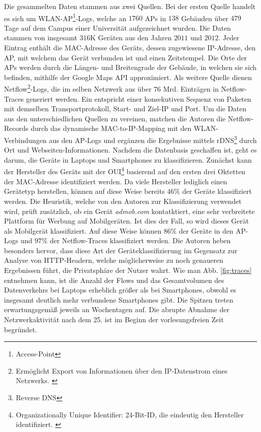 \documentclass[12pt, a4paper]{article}
\begin{document}
Die gesammelten Daten stammen aus zwei Quellen. Bei der ersten Quelle handelt es sich um WLAN-AP\footnote{Access-Point}-Logs,
welche an $1760$ APs in $138$ Gebäuden über $479$ Tage auf dem Campus einer Universität aufgezeichnet wurden. 
Die Daten stammen von insgesamt $316$\textsc{K} Geräten aus den Jahren $2011$ und $2012$. Jeder Eintrag enthält die 
MAC-Adresse des Geräts, dessen zugewiesene IP-Adresse, den AP, mit welchem das Gerät verbunden ist und einen Zeitstempel.
Die Orte der APs werden durch die Längen- und Breitengrade der Gebäude, in welchen sie sich befinden, mithilfe der Google Maps API
approximiert. Als weitere Quelle dienen Netflow\footnote{Ermöglicht Export von Informationen über den IP-Datenstrom eines 
Netzwerks. \cite{RFC3954}}-Logs, die im selben Netzwerk aus über $76$ Mrd. Einträgen in Netflow-Traces generiert werden.
Ein  entspricht einer konsekutiven Sequenz von Paketen
mit demselben Transportprotokoll, Start- und Ziel-IP und Port. \cite{Alipour2018}
Um die Daten aus den unterschiedlichen Quellen zu vereinen, matchen die Autoren die Netflow-Records 
durch das dynamische MAC-to-IP-Mapping mit den WLAN-Verbindungen aus den AP-Logs und ergänzen
die Ergebnisse mittels rDNS\footnote{Reverse DNS} durch Ort und Webseiten-Informationen.
Nachdem die Datenbasis geschaffen ist, geht es darum, die Geräte in Laptops und Smartphones zu klassifizieren.
Zunächst kann der Hersteller des Geräts mit der OUI\footnote{Organizationally Unique Identifier: 24-Bit-ID, 
die eindeutig den Hersteller identifiziert. \cite{RFC5342}} basierend auf den ersten drei Oktetten der MAC-Adresse identifiziert werden.
Da viele Hersteller lediglich einen Gerätetyp herstellen, können auf diese Weise bereits
$46 \%$ der Geräte klassifiziert werden. Die Heuristik, welche von den Autoren zur Klassifizierung verwendet wird,
prüft zusätzlich, ob ein Gerät \textit{admob.com} kontatktiert, eine sehr verbreitete Plattform für Werbung auf Mobilgeräten.
Ist dies der Fall, so wird dieses Gerät als Mobilgerät klassifiziert. Auf diese Weise können $86 \%$ der Geräte in den AP-Logs
und $97 \%$ der Netflow-Traces klassifiziert werden.
Die Autoren heben besonders hervor, dass diese Art der Geräteklassifizierung im Gegensatz zur Analyse von 
HTTP-Headern, welche möglicherweise zu noch genaueren Ergebnissen führt, die Privatsphäre der Nutzer wahrt.\newline
Wie man Abb. \ref{fig:traces} entnehmen kann, ist die Anzahl der Flows und das Gesamtvolumen des Datenverkehrs bei Laptops
erheblich größer als bei Smartphones, obwohl es insgesamt deutlich mehr verbundene Smartphones gibt. 
Die Spitzen treten erwartungsgemäß jeweils an Wochentagen auf. 
Die abrupte Abnahme der Netzwerkaktivität nach dem 25. ist im Beginn der vorlesungsfreien Zeit begründet.
\end{document}
